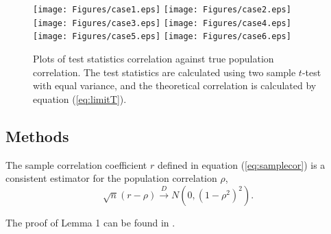 	\begin{figure}[!th]
		\centering
		\texttt{[image: Figures/case1.eps]}
		\texttt{[image: Figures/case2.eps]}
		\texttt{[image: Figures/case3.eps]}
		\texttt{[image: Figures/case4.eps]}
		\texttt{[image: Figures/case5.eps]}
		\texttt{[image: Figures/case6.eps]}
		\caption[Plots of test statistics correlation against true population 
		correlation]{Plots of test statistics correlation against true population 
			correlation. The test statistics are calculated 
			using two sample $t$-test with equal variance, and the theoretical correlation is 
			calculated by 
			equation (\ref{eq:limitT}).}
		\label{fig:tstat}
	\end{figure}
	
	
	
	
	
	
	\subsection{Methods}\label{section:testcormethod}
	
	\begin{lemma}
		The sample correlation coefficient $r$ defined in equation (\ref{eq:samplecor}) is a 
		consistent estimator for the population correlation $\rho$, 
		\[\sqrt{n}(r - \rho ) \stackrel{D}{\rightarrow}N\left(0, (1-\rho^2)^2\right).\]
	\end{lemma}
	The proof of Lemma 1 can be found in \citet{fisher1915frequency}. \\
	
